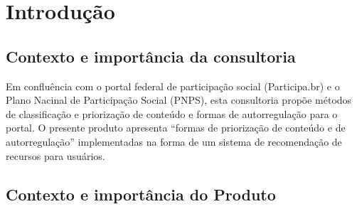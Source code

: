 \documentclass[12pt]{article}
\newcommand{\PalavrasChave}{reconhecimento de padrões, redes complexas, processamento de linguagem natural, participação social}
\begin{document}



\tableofcontents
\newpage


\begin{abstract}
Este documento descreve rotinas de priorização de conteúdo e de autorregulação para o portal federal de participação social.\\

{\bf Palavras-chave:} \PalavrasChave.
\end{abstract}
\newpage

\section{Introdução}
\subsection{Contexto e importância da consultoria}
Em confluência com o portal federal de participação social (Participa.br) e o Plano Nacinal de Participação Social (PNPS), esta consultoria propõe métodos de classificação e priorização de conteúdo e formas de autorregulação para o portal. O presente produto apresenta ``formas de priorização de conteúdo e de autorregulação'' implementadas na forma de um sistema de recomendação de recursos para usuários.

\subsection{Contexto e importância do Produto}
\end{document}
